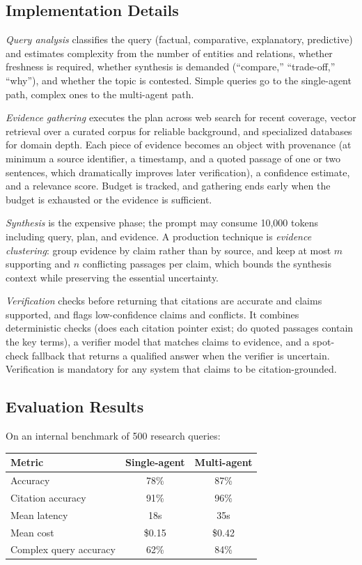 \documentclass[11pt]{book}
\begin{document}
\subsection{Implementation Details}

\textit{Query analysis} classifies the query (factual, comparative, explanatory, predictive) and estimates complexity from the number of entities and relations, whether freshness is required, whether synthesis is demanded (``compare,'' ``trade-off,'' ``why''), and whether the topic is contested. Simple queries go to the single-agent path, complex ones to the multi-agent path.

\textit{Evidence gathering} executes the plan across web search for recent coverage, vector retrieval over a curated corpus for reliable background, and specialized databases for domain depth. Each piece of evidence becomes an object with provenance (at minimum a source identifier, a timestamp, and a quoted passage of one or two sentences, which dramatically improves later verification), a confidence estimate, and a relevance score. Budget is tracked, and gathering ends early when the budget is exhausted or the evidence is sufficient.

\textit{Synthesis} is the expensive phase; the prompt may consume 10{,}000 tokens including query, plan, and evidence. A production technique is \textit{evidence clustering}: group evidence by claim rather than by source, and keep at most $m$ supporting and $n$ conflicting passages per claim, which bounds the synthesis context while preserving the essential uncertainty.

\textit{Verification} checks before returning that citations are accurate and claims supported, and flags low-confidence claims and conflicts. It combines deterministic checks (does each citation pointer exist; do quoted passages contain the key terms), a verifier model that matches claims to evidence, and a spot-check fallback that returns a qualified answer when the verifier is uncertain. Verification is mandatory for any system that claims to be citation-grounded.

\subsection{Evaluation Results}

On an internal benchmark of 500 research queries:

\begin{center}
\begin{tabular}{lcc}
\toprule
Metric & Single-agent & Multi-agent \\
\midrule
Accuracy & 78\% & 87\% \\
Citation accuracy & 91\% & 96\% \\
Mean latency & 18s & 35s \\
Mean cost & \$0.15 & \$0.42 \\
Complex query accuracy & 62\% & 84\% \\
\bottomrule
\end{tabular}
\end{center}
\end{document}
